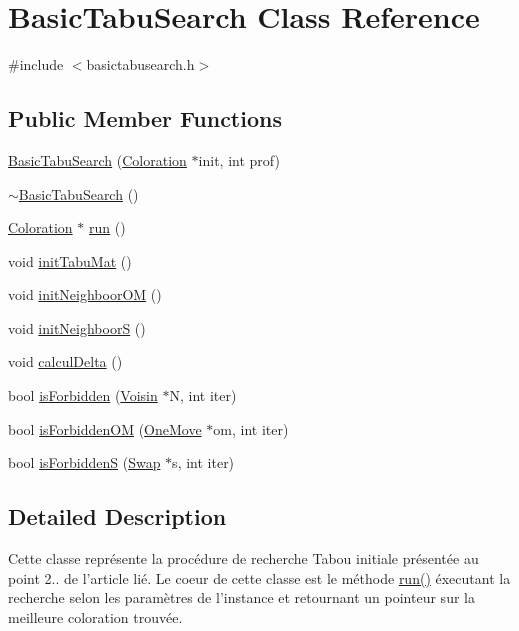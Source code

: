 \hypertarget{classBasicTabuSearch}{\section{Basic\-Tabu\-Search Class Reference}
\label{classBasicTabuSearch}
}


{\ttfamily \#include $<$basictabusearch.\-h$>$}

\subsection*{Public Member Functions}
\begin{DoxyCompactItemize}
\item 
\hyperlink{classBasicTabuSearch_a30a404fa4c0c95bdbfdf9b8d9387145b}{Basic\-Tabu\-Search} (\hyperlink{classColoration}{Coloration} $\ast$init, int prof)
\item 
\hyperlink{classBasicTabuSearch_ad4449024a20e6609dd20884696356c8a}{$\sim$\-Basic\-Tabu\-Search} ()
\item 
\hyperlink{classColoration}{Coloration} $\ast$ \hyperlink{classBasicTabuSearch_a439b45b01e2fb3c39668deaabdce6945}{run} ()
\item 
void \hyperlink{classBasicTabuSearch_ae51343045059a6e810b962429b8928d6}{init\-Tabu\-Mat} ()
\item 
void \hyperlink{classBasicTabuSearch_aa64a2c376b8e8c594163c1967126bb15}{init\-Neighboor\-O\-M} ()
\item 
void \hyperlink{classBasicTabuSearch_ae84e184edf1ef484d53107759433613b}{init\-Neighboor\-S} ()
\item 
void \hyperlink{classBasicTabuSearch_a14a157e898bba846f3b00f25b7c64fe2}{calcul\-Delta} ()
\item 
bool \hyperlink{classBasicTabuSearch_aa88417b74f0d99d694309226306eedef}{is\-Forbidden} (\hyperlink{classVoisin}{Voisin} $\ast$N, int iter)
\item 
bool \hyperlink{classBasicTabuSearch_af4f4afee741e09940ea4b8c47468613a}{is\-Forbidden\-O\-M} (\hyperlink{classOneMove}{One\-Move} $\ast$om, int iter)
\item 
bool \hyperlink{classBasicTabuSearch_a6d5c0de432bfe36a379e0cdb52457728}{is\-Forbidden\-S} (\hyperlink{classSwap}{Swap} $\ast$s, int iter)
\end{DoxyCompactItemize}


\subsection{Detailed Description}
Cette classe représente la procédure de recherche Tabou initiale présentée au point 2.. de l'article lié. Le coeur de cette classe est le méthode \hyperlink{classBasicTabuSearch_a439b45b01e2fb3c39668deaabdce6945}{run()} éxecutant la recherche selon les paramètres de l'instance et retournant un pointeur sur la meilleure coloration trouvée. 

